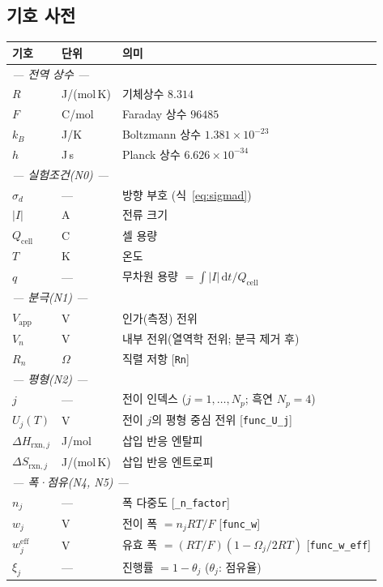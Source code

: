 \documentclass[11pt,a4paper]{article}
\newcommand{\dd}{\mathrm{d}}
\newcommand{\eff}{\mathrm{eff}}
\newcommand{\app}{\mathrm{app}}
\newcommand{\cell}{\mathrm{cell}}
\begin{document}
\subsection{기호 사전}
\begin{longtable}{p{} p{} p{}}
\toprule 기호 & 단위 & 의미 \\ \midrule \endhead
\multicolumn{3}{l}{\emph{--- 전역 상수 ---}}\\
$R$ & J/(mol\,K) & 기체상수 $8.314$ \\
$F$ & C/mol & Faraday 상수 $96485$ \\
$k_B$ & J/K & Boltzmann 상수 $1.381\times10^{-23}$ \\
$h$ & J\,s & Planck 상수 $6.626\times10^{-34}$ \\
\multicolumn{3}{l}{\emph{--- 실험조건(N0) ---}}\\
$\sigma_d$ & --- & 방향 부호 (식~\eqref{eq:sigmad}) \\
$|I|$ & A & 전류 크기 \\
$Q_\cell$ & C & 셀 용량 \\
$T$ & K & 온도 \\
$q$ & --- & 무차원 용량 $=\int|I|\,\dd t/Q_\cell$ \\
\multicolumn{3}{l}{\emph{--- 분극(N1) ---}}\\
$V_\app$ & V & 인가(측정) 전위 \\
$V_n$ & V & 내부 전위(열역학 전위; 분극 제거 후) \\
$R_n$ & $\Omega$ & 직렬 저항 [\texttt{Rn}] \\
\multicolumn{3}{l}{\emph{--- 평형(N2) ---}}\\
$j$ & --- & 전이 인덱스 ($j=1,\dots,N_p$; 흑연 $N_p=4$) \\
$U_j(T)$ & V & 전이 $j$의 평형 중심 전위 [\texttt{func\_U\_j}] \\
$\Delta H_{\mathrm{rxn},j}$ & J/mol & 삽입 반응 엔탈피 \\
$\Delta S_{\mathrm{rxn},j}$ & J/(mol\,K) & 삽입 반응 엔트로피 \\
\multicolumn{3}{l}{\emph{--- 폭·점유(N4, N5) ---}}\\
$n_j$ & --- & 폭 다중도 [\texttt{\_n\_factor}] \\
$w_j$ & V & 전이 폭 $=n_jRT/F$ [\texttt{func\_w}] \\
$w_j^{\eff}$ & V & 유효 폭 $=(RT/F)(1-\Omega_j/2RT)$ [\texttt{func\_w\_eff}] \\
$\xi_j$ & --- & 진행률 $=1-\theta_j$ ($\theta_j$: 점유율) \\

\end{longtable}
\end{document}

